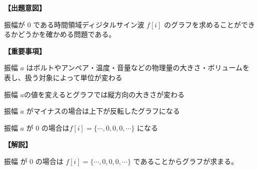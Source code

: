 \noindent \textbf{【出題意図】}

\noindent 振幅が $0$ である時間領域ディジタルサイン波 $f[i]$ のグラフを求めることができるかどうかを確かめる問題である。

\vspace{1em}
\noindent \textbf{【重要事項】}

\bigskip
\noindent\quad 振幅 $a$ はボルトやアンペア・温度・音量などの物理量の大きさ・ボリュームを表し、扱う対象によって単位が変わる

\bigskip
\noindent\quad 振幅 $a$の値を変えるとグラフでは縦方向の大きさが変わる

\bigskip
\noindent\quad 振幅 $a$ がマイナスの場合は上下が反転したグラフになる

\bigskip
\noindent\quad 振幅 $a$ が $0$ の場合は$f[i]=\{\cdots,0,0,0,\cdots\}$ になる


\vspace{1em}
\noindent \textbf{【解説】}

\noindent 振幅 が $0$ の場合は $f[i]=\{\cdots,0,0,0,\cdots\}$ であることからグラフが求まる。
